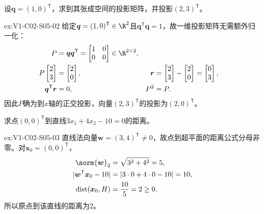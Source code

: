 \begin{SLChapterExercisePairSection}
\begin{exercise}[投影矩阵]\label{ex:V1-C02-S05-02}
设$\boldsymbol{q}=(1,0)^{\mathsf T}$，求到其张成空间的投影矩阵，并投影$(2,3)^{\mathsf T}$。
\end{exercise}
\label{sol:V1-C02-S05-02}
\begin{chapterexercisesolution}{ex:V1-C02-S05-02}
给定$\boldsymbol q=(1,0)^{\mathsf T}\in\R^2$且$\boldsymbol q^{\mathsf T}\boldsymbol q=1$，故一维投影矩阵无需额外归一化：
\[
\begin{aligned}
P&=\boldsymbol q\boldsymbol q^{\mathsf T}
=\begin{bmatrix}1&0\\0&0\end{bmatrix}\in\R^{2\times2},\\
P\begin{bmatrix}2\\3\end{bmatrix}
&=\begin{bmatrix}2\\0\end{bmatrix},
&\boldsymbol r&=\begin{bmatrix}2\\3\end{bmatrix}
-\begin{bmatrix}2\\0\end{bmatrix}=\begin{bmatrix}0\\3\end{bmatrix},\\
\boldsymbol q^{\mathsf T}\boldsymbol r&=0,
&P^2&=P.
\end{aligned}
\]
因此$P$确为到$x$轴的正交投影，向量$(2,3)^{\mathsf T}$的投影为$(2,0)^{\mathsf T}$。
\end{chapterexercisesolution}

\begin{exercise}[点到直线距离]\label{ex:V1-C02-S05-03}
求点$(0,0)^{\mathsf T}$到直线$3x_1+4x_2-10=0$的距离。
\end{exercise}
\label{sol:V1-C02-S05-03}
\begin{chapterexercisesolution}{ex:V1-C02-S05-03}
直线法向量$\boldsymbol w=(3,4)^{\mathsf T}\ne0$，故点到超平面的距离公式分母非零。对$\boldsymbol x_0=(0,0)^{\mathsf T}$，
\[
\begin{aligned}
\norm{\boldsymbol w}_2&=\sqrt{3^2+4^2}=5,\\
|\boldsymbol w^{\mathsf T}\boldsymbol x_0-10|
&=|3\cdot0+4\cdot0-10|=10,\\
\operatorname{dist}(\boldsymbol x_0,H)&=\frac{10}{5}=2\ge0.
\end{aligned}
\]
所以原点到该直线的距离为$2$。
\end{chapterexercisesolution}


\end{SLChapterExercisePairSection}
